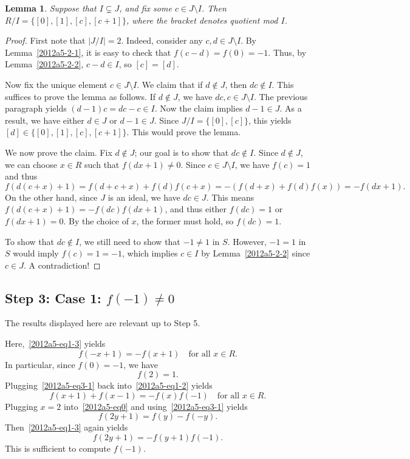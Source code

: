 \documentclass{article}
\newtheorem{lemma}{Lemma}
\begin{document}
\begin{lemma}\label{2012a5-2-3}
Suppose that $I \subsetneq J$, and fix some $c \in J \setminus I$.
Then $R/I = \{[0], [1], [c], [c + 1]\}$, where the bracket denotes quotient mod $I$.
\end{lemma}
\begin{proof}
First note that $|J/I| = 2$.
Indeed, consider any $c, d \in J \setminus I$.
By Lemma~\ref{2012a5-2-1}, it is easy to check that $f(c - d) = f(0) = -1$.
Thus, by Lemma~\ref{2012a5-2-2}, $c - d \in I$, so $[c] = [d]$.

Now fix the unique element $c \in J \setminus I$.
We claim that if $d \notin J$, then $dc \notin I$.
This suffices to prove the lemma as follows.
If $d \notin J$, we have $dc, c \in J \setminus I$.
The previous paragraph yields $(d - 1) c = dc - c \in I$.
Now the claim implies $d - 1 \in J$.
As a result, we have either $d \in J$ or $d - 1 \in J$.
Since $J/I = \{[0], [c]\}$, this yields $[d] \in \{[0], [1], [c], [c + 1]\}$.
This would prove the lemma.

We now prove the claim.
Fix $d \notin J$; our goal is to show that $dc \notin I$.
Since $d \notin J$, we can choose $x \in R$ such that $f(dx + 1) \neq 0$.
Since $c \in J \setminus I$, we have $f(c) = 1$ and thus
\[ f(d(c + x) + 1) = f(d + c + x) + f(d) f(c + x) = -(f(d + x) + f(d) f(x)) = -f(dx + 1). \]
On the other hand, since $J$ is an ideal, we have $dc \in J$.
This means $f(d(c + x) + 1) = -f(dc) f(dx + 1)$, and thus either $f(dc) = 1$ or $f(dx + 1) = 0$.
By the choice of $x$, the former must hold, so $f(dc) = 1$.

To show that $dc \notin I$, we still need to show that $-1 \neq 1$ in $S$.
However, $-1 = 1$ in $S$ would imply $f(c) = 1 = -1$, which implies $c \in I$ by Lemma~\ref{2012a5-2-2} since $c \in J$.
A contradiction!
\end{proof}









\subsection*{Step 3: Case 1: $f(-1) \neq 0$}

The results displayed here are relevant up to Step 5.

Here,~\eqref{2012a5-eq1-3} yields
\[ f(-x + 1) = -f(x + 1) \quad \text{for all } x \in R. \tag{3.1}\label{2012a5-eq3-1} \]
In particular, since $f(0) = -1$, we have
\[ f(2) = 1. \tag{3.2}\label{2012a5-eq3-2} \]
Plugging~\eqref{2012a5-eq3-1} back into~\eqref{2012a5-eq1-2} yields
\[ f(x + 1) + f(x - 1) = -f(x) f(-1) \quad \text{for all } x \in R. \tag{3.3}\label{2012a5-eq3-3} \]
Plugging $x = 2$ into~\eqref{2012a5-eq0} and using~\eqref{2012a5-eq3-1} yields
\[ f(2y + 1) = f(y) - f(-y). \tag{3.4}\label{2012a5-eq3-4} \]
Then~\eqref{2012a5-eq1-3} again yields
\[ f(2y + 1) = -f(y + 1) f(-1). \tag{3.5}\label{2012a5-eq3-5} \]
This is sufficient to compute $f(-1)$.
\end{document}
